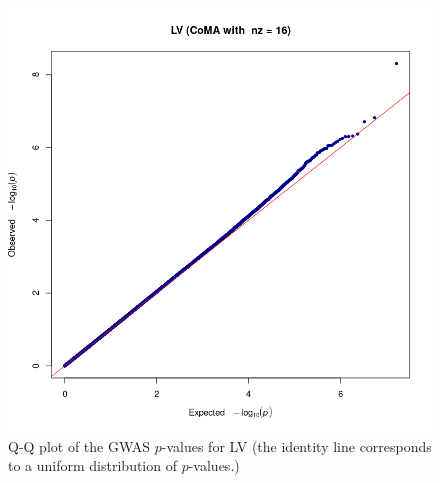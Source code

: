 \documentclass[twocolumn]{llncs}
\begin{document}
\begin{figure}
\includegraphics[width=\linewidth]{figs/gwas/2020-04-24_13_19_26_631106__LV__nz__16__gwas__qqplot__inv_norm__GBR.png}
\caption{Q-Q plot of the GWAS $p$-values for LV (the identity line corresponds to a uniform distribution of $p$-values.)}
\label{fig:qqplot_LV_pooled}
\end{figure}
\end{document}
